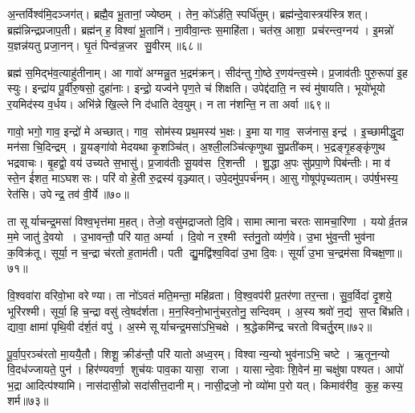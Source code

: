 अ॒न्तर्विश्व॑मि॒दञ्जग॑त्। ब्रह्मै॒व भू॒तानां॒ ज्येष्ठम्। तेन॒ को॑ऽर्\mbox{}हति॒ स्पर्धि॑तुम्। ब्रह्म॑न्दे॒वास्त्रय॑स्त्रिशत्। ब्रह्म॑न्निन्द्रप्रजाप॒ती। ब्रह्म॑न् ह॒ विश्वा॑ भू॒तानि॑। ना॒वीवा॒न्तः स॒माहि॑ता। चत॑स्र॒ आशा॒ प्रच॑रन्त्व॒ग्नय॑। इ॒मन्नो॑ य॒ज्ञन्न॑यतु प्रजा॒नन्। घृ॒तं पिन्व॑न्न॒जर सु॒वीरम्॥६८॥

ब्रह्म॑ स॒मिद्भ॑व॒त्याहु॑तीनाम्। आ गावो॑ अग्मन्नु॒त भ॒द्रम॑क्रन्। सीद॑न्तु गो॒ष्ठे र॒णय॑न्त्व॒स्मे। प्र॒जाव॑तीः पुरु॒रूपा॑ इ॒ह स्युः। इन्द्रा॑य पू॒र्वीरु॒षसो॒ दुहा॑नाः। इन्द्रो॒ यज्व॑ने पृण॒ते च॑ शिक्षति। उपेद्द॑दाति॒ न स्वं मु॑षायति। भूयो॑भूयो र॒यमिद॑स्य व॒र्धय\sn{}। अभि॑न्ने खि॒ल्ले नि द॑धाति देव॒युम्। न ता न॑शन्ति॒ न ता अर्वा॥६९॥

गावो॒ भगो॒ गाव॒ इन्द्रो॑ मे अच्छात्। गाव॒ सोम॑स्य प्रथ॒मस्य॑ भ॒क्षः। इ॒मा या गाव॒ सज॑नास॒ इन्द्र॑। इ॒च्छामीद्धृ॒दा मन॑सा चि॒दिन्द्रम्। यू॒यङ्गा॑वो मेदयथा कृ॒शञ्चि॑त्। अ॒श्ली॒लञ्चि॑त्कृणुथा सु॒प्रती॑कम्। भ॒द्रङ्गृ॒हङ्कृ॑णुथ भद्रवाचः। बृ॒हद्वो॒ वय॑ उच्यते स॒भासु॑। प्र॒जाव॑तीः सू॒यव॑स रि॒शन्ती। शु॒द्धा अ॒पः सु॑प्रपा॒णे पिब॑न्तीः। मा व॑ स्ते॒न ई॑शत॒ माऽघशसः। परि॑ वो हे॒ती रु॒द्रस्य॑ वृञ्ज्यात्। उपे॒दमु॑प॒पर्च॑नम्। आ॒सु गोषूप॑पृच्यताम्। उप॑र्\mbox{}ष॒भस्य॒ रेत॑सि। उपेन्द्र॒ तव॑ वी॒र्ये॥७०॥\anuvakamend[च॒रा॒मि॒ कनी॑यो॒ऽन्यानर्पि॑ता प॒दानि॒ यज्व॑सु हवामहे वि॒ष्ठा लो॒काः सु॒वीर॒मर्वा॒ पिब॑न्ती॒ष्षट्च॑]

ता सूर्याचन्द्र॒मसा॑ विश्व॒भृत्त॑मा म॒हत्। तेजो॒ वसु॑मद्राजतो दि॒वि। सामात्माना चरतः सामचा॒रिणा। ययोर्व्र॒तन्न म॒मे जातु॑ दे॒वयो। उ॒भावन्तौ॒ परि॑ यात॒ अर्म्या। दि॒वो न र॒श्मी स्त॑नु॒तो व्य॑र्ण॒वे। उ॒भा भु॑व॒न्ती भुव॑ना क॒विक्र॑तू। सूर्या॒ न च॒न्द्रा च॑रतो ह॒ताम॑ती। पती द्यु॒मद्वि॑श्व॒विदा॑ उ॒भा दि॒वः। सूर्या॑ उ॒भा च॒न्द्रम॑सा विचक्ष॒णा॥७१॥

वि॒श्ववा॑रा वरिवो॒भा वरेण्या। ता नो॑ऽवतं मति॒मन्ता॒ महि॑व्रता। वि॒श्व॒वप॑री प्र॒तर॑णा तर॒न्ता। सु॒व॒र्विदा॑ दृ॒शये॒ भूरि॑रश्मी। सूर्या॒ हि च॒न्द्रा वसु॑ त्वे॒षद॑र्शता। म॒न॒स्विनो॒भानु॑चर॒तोनु॒ सन्दिवम्। अ॒स्य श्रवो॑ न॒द्य॑ स॒प्त बि॑भ्रति। द्यावा॒ क्षामा॑ पृथि॒वी द॑र्\mbox{}श॒तं वपु॑। अ॒स्मे सूर्याचन्द्र॒मसा॑ऽभि॒चक्षे। श्र॒द्धेकमि॑न्द्र चरतो विचर्तु॒रम्॥७२॥

पू॒र्वा॒प॒रञ्च॑रतो मा॒ययै॒तौ। शिशू॒ क्रीड॑न्तौ॒ परि॑ यातो अध्व॒रम्। विश्वान्य॒न्यो भुव॑नाऽभि॒ चष्टे। ऋ॒तून॒न्यो वि॒दध॑ज्जायते॒ पुन॑। हिर॑ण्यवर्णा॒ शुच॑यः पाव॒का यासा॒ राजा। यासान्दे॒वाः शि॒वेन॑ मा॒ चक्षु॑षा पश्यत। आपो॑ भ॒द्रा आदित्प॑श्यामि। नास॑दासी॒न्नो सदा॑सीत्त॒दानीम्। नासी॒द्रजो॒ नो व्यो॑मा प॒रो यत्। किमाव॑रीव॒ कुह॒ कस्य॒ शर्म\sn{}॥७३॥

